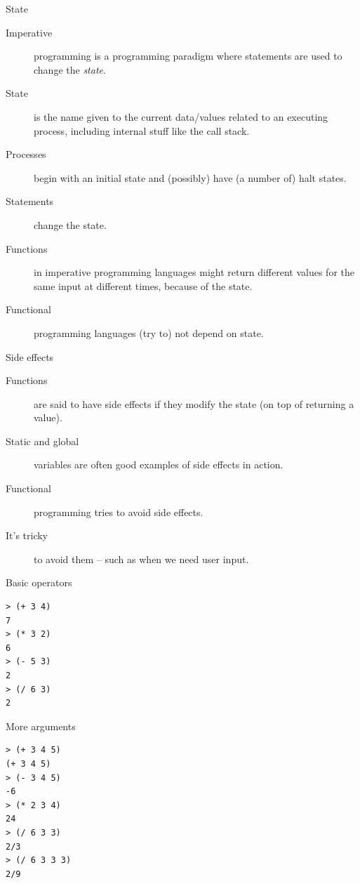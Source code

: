 \begin{frame}{State}
\begin{description}
  \item[Imperative] programming is a programming paradigm where statements are used to change the \emph{state}.
  \item[State] is the name given to the current data/values related to an executing process, including internal stuff like the call stack.
  \item[Processes] begin with an initial state and (possibly) have (a number of) halt states.
  \item[Statements] change the state.
  \item[Functions] in imperative programming languages might return different values for the same input at different times, because of the state.
  \item[Functional] programming languages (try to) not depend on state.
\end{description}
\end{frame}


\begin{frame}{Side effects}
  \begin{description}
    \item[Functions] are said to have side effects if they modify the state (on top of returning a value).
    \item[Static and global] variables are often good examples of side effects in action.
    \item[Functional] programming tries to avoid side effects.
    \item[It's tricky] to avoid them -- such as when we need user input.
  \end{description}
\end{frame}

\begin{frame}[fragile]{Basic operators}
\begin{verbatim}
> (+ 3 4)
7
> (* 3 2)
6
> (- 5 3)
2
> (/ 6 3)
2
\end{verbatim}
\end{frame}

\begin{frame}[fragile]{More arguments}
\begin{verbatim}
> (+ 3 4 5)
(+ 3 4 5)
> (- 3 4 5)
-6
> (* 2 3 4)
24
> (/ 6 3 3)
2/3
> (/ 6 3 3 3)
2/9
\end{verbatim}
\end{frame}



